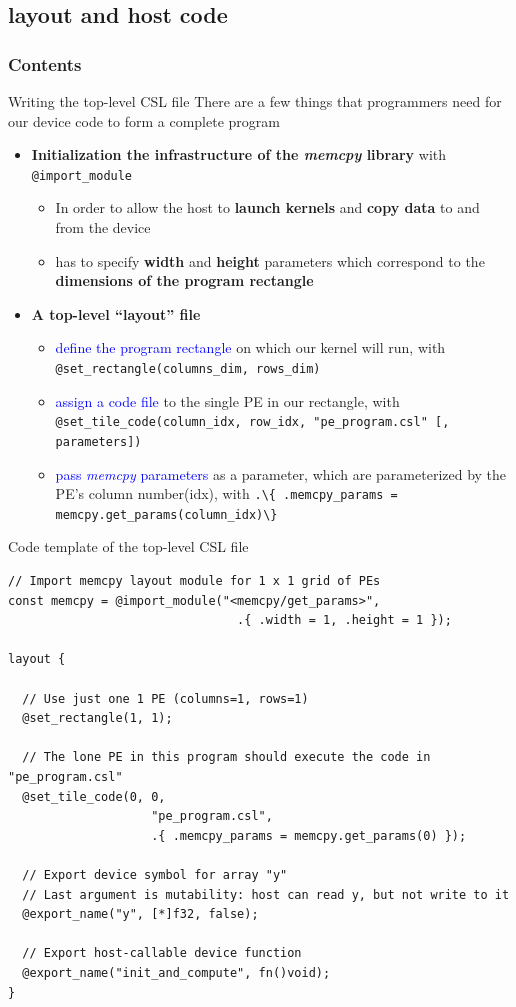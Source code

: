 \documentclass[dvipdfmx, 11pt, aspectratio=169]{beamer}   %
\begin{document}
\subsection{layout and host code}
\begin{frame}
    \frametitle{Contents}
    \tableofcontents[currentsubsection]
\end{frame}
\begin{frame}{Writing the top-level CSL file}
There are a few things that programmers need for our device code to form a complete program
\begin{itemize}
    \item \textbf{Initialization the infrastructure of the \textit{memcpy} library} with \lstinline|@import_module|
    \begin{itemize}
        \item In order to allow the host to \textbf{launch kernels} and \textbf{copy data} to and from the device
        \item has to specify \textbf{width} and \textbf{height} parameters which correspond to the \textbf{dimensions of the program rectangle}
    \end{itemize}
    \item \textbf{A top-level “layout” file}
    \begin{itemize}
        \item \textcolor{blue}{define the program rectangle} on which our kernel will run, with \lstinline|@set_rectangle(columns_dim, rows_dim)|
        \item \textcolor{blue}{assign a code file} to the single PE in our rectangle, with \lstinline|@set_tile_code(column_idx, row_idx, "pe_program.csl" [, parameters])|
        \item \textcolor{blue}{pass \textit{memcpy} parameters} as a parameter, which are parameterized by the PE's column number(idx), with \lstinline|.\{ .memcpy_params = memcpy.get_params(column_idx)\}|
    \end{itemize}
\end{itemize}
\end{frame}
\begin{frame}[fragile]{Code template of the top-level CSL file}
\begin{lstlisting}[language=CSL, basicstyle=\ttfamily\tiny]
// Import memcpy layout module for 1 x 1 grid of PEs
const memcpy = @import_module("<memcpy/get_params>", 
                                .{ .width = 1, .height = 1 });

layout {

  // Use just one 1 PE (columns=1, rows=1)
  @set_rectangle(1, 1);

  // The lone PE in this program should execute the code in "pe_program.csl"
  @set_tile_code(0, 0, 
                    "pe_program.csl",
                    .{ .memcpy_params = memcpy.get_params(0) });

  // Export device symbol for array "y"
  // Last argument is mutability: host can read y, but not write to it
  @export_name("y", [*]f32, false);

  // Export host-callable device function
  @export_name("init_and_compute", fn()void);
}
\end{lstlisting}
\end{frame}
\end{document}
